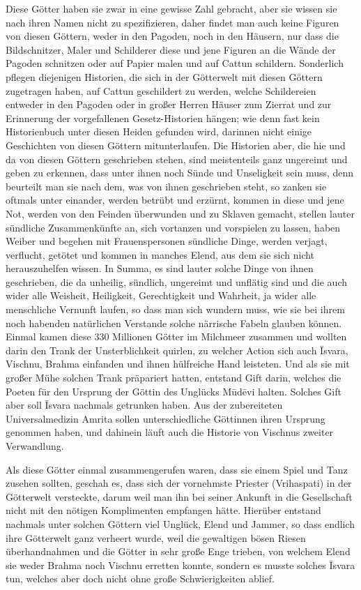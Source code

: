\documentclass{article}
\begin{document}
Diese Götter haben sie zwar in eine gewisse Zahl gebracht, aber sie wissen sie nach ihren Namen nicht zu spezifizieren, daher findet man auch keine Figuren von diesen Göttern, weder in den Pagoden, noch in den Häusern, nur dass die Bildschnitzer, Maler und Schilderer diese und jene Figuren an die Wände der Pagoden schnitzen oder auf Papier malen und auf Cattun schildern. Sonderlich pflegen diejenigen Historien, die sich in der Götterwelt mit diesen Göttern zugetragen haben, auf Cattun geschildert zu werden, welche Schildereien entweder in den Pagoden oder in großer Herren Häuser zum Zierrat und zur Erinnerung der vorgefallenen Gesetz-Historien hängen; wie denn fast kein Historienbuch unter diesen Heiden gefunden wird, darinnen nicht einige Geschichten von diesen Göttern mitunterlaufen. Die Historien aber, die hie und da von diesen Göttern geschrieben stehen, sind meistenteils ganz ungereimt und geben zu erkennen, dass unter ihnen noch Sünde und Unseligkeit sein muss, denn beurteilt man sie nach dem, was von ihnen geschrieben steht, so zanken sie oftmals unter einander, werden betrübt und erzürnt, kommen in diese und jene Not, werden von den Feinden überwunden und zu Sklaven gemacht, stellen lauter sündliche Zusammenkünfte an, sich vortanzen und vorspielen zu lassen, haben Weiber und begehen mit Frauenspersonen sündliche Dinge, werden verjagt, verflucht, getötet und kommen in manches Elend, aus dem sie sich nicht herauszuhelfen wissen. In Summa, es sind lauter solche Dinge von ihnen geschrieben, die da unheilig, sündlich, ungereimt und unflätig sind und die auch wider alle Weisheit, Heiligkeit, Gerechtigkeit und Wahrheit, ja wider alle menschliche Vernunft laufen, so dass man sich wundern muss, wie sie bei ihrem noch habenden natürlichen Verstande solche närrische Fabeln glauben können. Einmal kamen diese 330 Millionen Götter im Milchmeer zusammen und wollten darin den Trank der Unsterblichkeit quirlen, zu welcher Action sich auch \={I}svara, Vischnu, Brahma einfanden und ihnen hülfreiche Hand leisteten. Und als sie mit großer Mühe solchen Trank präpariert hatten, entstand Gift darin, welches die Poeten für den Ursprung der Göttin des Unglücks M\={u}d\={e}vi halten. Solches Gift aber soll \={I}svara nachmals getrunken haben. Aus der zubereiteten Universalmedizin Amrita sollen unterschiedliche Göttinnen ihren Ursprung genommen haben, und dahinein läuft auch die Historie von Vischnus zweiter Verwandlung.

Als diese Götter einmal zusammengerufen waren, dass sie einem Spiel und Tanz zusehen sollten, geschah es, dass sich der vornehmste Priester (Vrihaspati) in der Götterwelt versteckte, darum weil man ihn bei seiner Ankunft in die Gesellschaft nicht mit den nötigen Komplimenten empfangen hätte. Hierüber entstand nachmals unter solchen Göttern viel Unglück, Elend und Jammer, so dass endlich ihre Götterwelt ganz verheert wurde, weil die gewaltigen bösen Riesen überhandnahmen und die Götter in sehr große Enge trieben, von welchem Elend sie weder Brahma noch Vischnu erretten konnte, sondern es musste solches \={I}svara tun, welches aber doch nicht ohne große Schwierigkeiten ablief.
\end{document}

